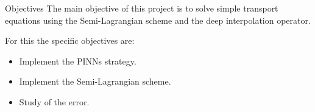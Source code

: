 \begin{frame}{Objectives}
  The main objective of this project is to solve simple transport equations using the Semi-Lagrangian scheme and the deep interpolation operator.
  
  \vspace{0.5cm}

  For this the specific objectives are: \\

  \vspace{0.3cm}

  \begin{itemize}
    \item Implement the PINNs strategy. 
    \item Implement the Semi-Lagrangian scheme.
    \item Study of the error. 
  \end{itemize}

\end{frame}

